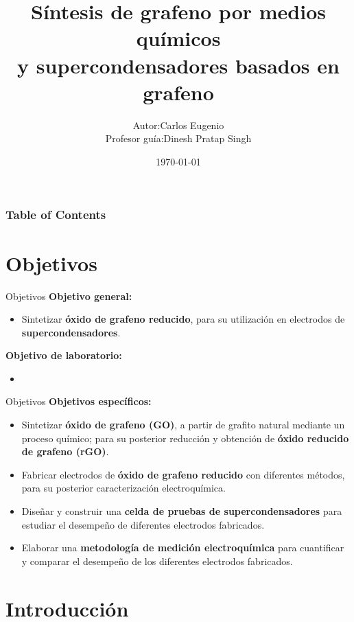 \documentclass[aspectratio=169]{beamer}
\title{Síntesis de grafeno por medios químicos\\y supercondensadores basados en grafeno}
\date{\today}
\institute{Universidad de Santiago de Chile\\ Laboratorio de Nanosíntesis}
\begin{document}
	\author[Carlos Eugenio]{\begin{tabular}{r@{ }l} 
			Autor:      & Carlos Eugenio \\[1ex] 
			Profesor guía: & Dinesh Pratap Singh
	\end{tabular}}
	\maketitle
	\begin{frame}
		\frametitle{Table of Contents}
		\tableofcontents
	\end{frame}

	\section{Objetivos}
	\begin{frame}{Objetivos}
		\textbf{Objetivo general:}
		\begin{itemize}
			\item Sintetizar \textbf{óxido de grafeno reducido}, para su utilización en electrodos de \textbf{supercondensadores}.
		\end{itemize}
		\textbf{Objetivo de laboratorio:}
		\begin{itemize}
			\item 
		\end{itemize}
	\end{frame}

	\begin{frame}{Objetivos}
		\textbf{Objetivos específicos:}
		\begin{itemize}[<+->]
			\item Sintetizar \textbf{óxido de grafeno (GO)}, a partir de grafito natural mediante un proceso químico; para su posterior reducción y obtención de \textbf{óxido reducido de grafeno (rGO)}.
			\item Fabricar electrodos de \textbf{óxido de grafeno reducido} con diferentes métodos, para su posterior caracterización electroquímica.
			\item Diseñar y construir una \textbf{celda de pruebas de supercondensadores} para estudiar el desempeño de diferentes electrodos fabricados.
			\item Elaborar una \textbf{metodología de medición electroquímica} para cuantificar y comparar el desempeño de los diferentes electrodos fabricados. 
		\end{itemize}
	\end{frame}

	\section{Introducción}
\end{document}
